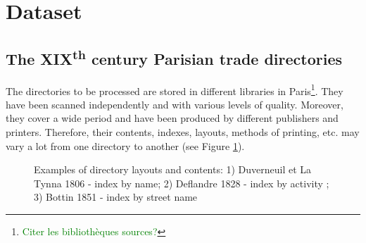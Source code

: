\section{Dataset}
\label{sec:dataset}


\subsection{The  XIX\textsuperscript{th} century Parisian trade directories}

The directories to be processed are stored in different libraries in Paris\footnote{\textcolor{green}{Citer les bibliothèques sources?} }. They have been scanned independently and with various levels of quality. Moreover, they cover a wide period and have been produced by different publishers and printers. Therefore, their contents, indexes, layouts, methods of printing, etc. may vary a lot from one directory to another (see Figure \ref{fig:directories}).


\begin{figure}[htb!]
	  \caption{\label{fig:directories} Examples of directory layouts and contents: 1) Duverneuil et La Tynna 1806 - index by name; 2) Deflandre 1828 - index by activity ; 3) Bottin 1851 - index by street name}
\end{figure}

